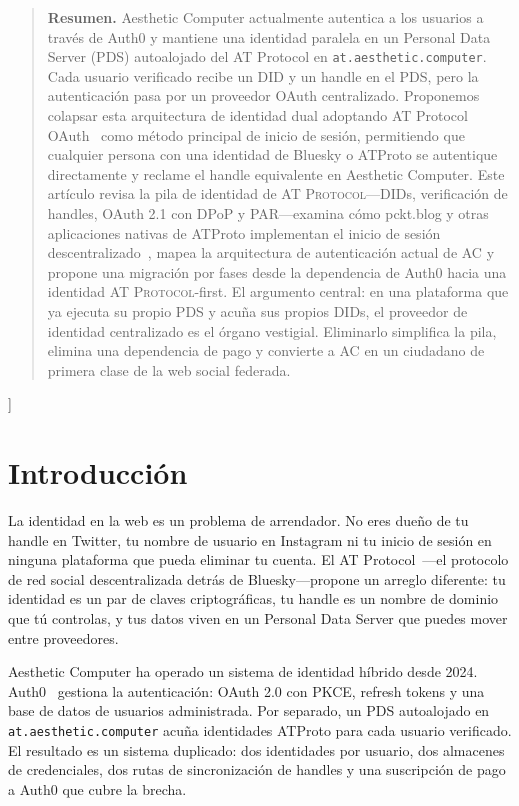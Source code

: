 \documentclass[10pt,letterpaper,twocolumn]{article}
\newcommand{\atproto}{\textsc{AT Protocol}}
\begin{document}
{\begin{quote}
\small\noindent\textbf{Resumen.}
Aesthetic Computer actualmente autentica a los usuarios a través de Auth0 y mantiene una identidad paralela en un Personal Data Server (PDS) autoalojado del AT Protocol en \texttt{at.aesthetic.computer}. Cada usuario verificado recibe un DID y un handle en el PDS, pero la autenticación pasa por un proveedor OAuth centralizado. Proponemos colapsar esta arquitectura de identidad dual adoptando AT Protocol OAuth~\citep{atproto2024oauth} como método principal de inicio de sesión, permitiendo que cualquier persona con una identidad de Bluesky o ATProto se autentique directamente y reclame el handle equivalente en Aesthetic Computer. Este artículo revisa la pila de identidad de \atproto{}---DIDs, verificación de handles, OAuth 2.1 con DPoP y PAR---examina cómo pckt.blog y otras aplicaciones nativas de ATProto implementan el inicio de sesión descentralizado~\citep{pcktblog2025}, mapea la arquitectura de autenticación actual de AC y propone una migración por fases desde la dependencia de Auth0 hacia una identidad \atproto{}-first. El argumento central: en una plataforma que ya ejecuta su propio PDS y acuña sus propios DIDs, el proveedor de identidad centralizado es el órgano vestigial. Eliminarlo simplifica la pila, elimina una dependencia de pago y convierte a AC en un ciudadano de primera clase de la web social federada.
\end{quote}
\vspace{0.5em}
}]


\section{Introducción}

La identidad en la web es un problema de arrendador. No eres dueño de tu handle en Twitter, tu nombre de usuario en Instagram ni tu inicio de sesión en ninguna plataforma que pueda eliminar tu cuenta. El AT Protocol~\citep{atproto2024spec}---el protocolo de red social descentralizada detrás de Bluesky---propone un arreglo diferente: tu identidad es un par de claves criptográficas, tu handle es un nombre de dominio que tú controlas, y tus datos viven en un Personal Data Server que puedes mover entre proveedores.

Aesthetic Computer ha operado un sistema de identidad híbrido desde 2024. Auth0~\citep{auth0spa} gestiona la autenticación: OAuth 2.0 con PKCE, refresh tokens y una base de datos de usuarios administrada. Por separado, un PDS autoalojado en \texttt{at.aesthetic.computer} acuña identidades ATProto para cada usuario verificado. El resultado es un sistema duplicado: dos identidades por usuario, dos almacenes de credenciales, dos rutas de sincronización de handles y una suscripción de pago a Auth0 que cubre la brecha.
\end{document}
